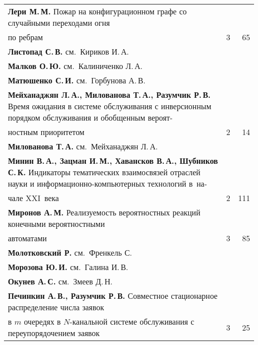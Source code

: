 {\begin{tabular}{p{388pt}rr}
\textbf{Лери М.\,М.} Пожар на конфигурационном графе со случайными
переходами огня\linebreak
\\[-12.35pt]
\hspace*{21pt}по ребрам&3&65\\[-.75pt]
\textbf{Листопад С.\,В.} см.\ Кириков И.\,А.&&\\[-.75pt]
\textbf{Малков О.\,Ю.} см.\ Калиниченко Л.\,А.&&\\[-.75pt]
\textbf{Матюшенко С.\,И.} см.\ Горбунова А.\,В.&&\\[-.75pt]
\hangindent=21pt\noindent\textbf{Мейханаджян Л.\,А., Милованова Т.\,А., Разумчик Р.\,В.}
Время ожидания в сис\-те\-ме обслуживания с инверсионным порядком обслуживания
и обобщенным вероят-\linebreak
\\[-12.35pt]
\hspace*{21pt}ностным приоритетом&2&14\\[-.75pt]
\textbf{Милованова Т.\,А.} см.\ Мейханаджян Л.\,А.&&\\[-.75pt]
\hangindent=21pt\noindent\textbf{Минин В.\,А., Зацман И.\,М., Хавансков В.\,А., Шубников С.\,К.}
Индикаторы тематических взаимосвязей отраслей науки и
информационно-компьютерных технологий в~на-\linebreak
\\[-12.35pt]
\hspace*{21pt}ча\-ле XXI~века&2&111\\[-.75pt]
\textbf{Миронов А.\,М.} Реализуемость вероятностных реакций конечными
вероятностными\linebreak
\\[-12.35pt]
\hspace*{21pt}автоматами&3&85\\[-.75pt]
\textbf{Молотковский Р.} см.\ Френкель С.&&\\[-.75pt]
\textbf{Морозова Ю.\,И.} см.\ Галина И.\,В.&&\\[-.75pt]
\textbf{Окунев А.\,С.} см.\ Змеев Д.\,Н.&&\\[-.75pt]
\textbf{Печинкин А.\,В., Разумчик Р.\,В.} Совместное стационарное
распределение числа заявок\linebreak
\\[-12.35pt]
\hspace*{21pt}в $m$ очередях в $N$-канальной сис\-те\-ме
обслуживания с переупорядочением заявок&3&25\\[-.75pt]
\end{tabular}
}

